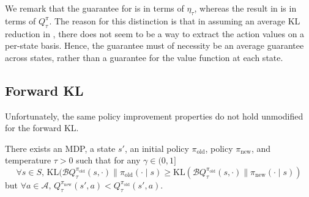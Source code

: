 \documentclass[twoside,11pt]{article}
\newcommand{\actionspace}{\mathcal{A}}
\newcommand{\KL}{\mathrm{KL}}
\newcommand{\boltzmannQ}{\mathcal{B}Q}
\newcommand{\pinew}{{\pi_\mathrm{new}}}
\newcommand{\piold}{{\pi_\mathrm{old}}}
\begin{document}
We remark that the guarantee for  is in terms of $\eta_\tau$, whereas the result in  is in terms of $Q^\pi_\tau$. The reason for this distinction is that in assuming an average KL reduction in , there does not seem to be a way to extract the action values on a per-state basis. Hence, the guarantee must of necessity be an average guarantee across states, rather than a guarantee for the value function at each state. 


\subsection{Forward KL}
Unfortunately, the same policy improvement properties do not hold unmodified for the forward KL. 
\begin{proposition}\label{lem:forward-kl-counterexample}
There exists an MDP, a state $s'$, an initial policy $\piold$, policy $\pinew$, and temperature $\tau > 0$ such that for any $\gamma \in (0, 1]$
\begin{equation*}
    \forall s \in S,\, \KL(\boltzmannQ_\tau^\piold(s, \cdot) \parallel \piold(\cdot \mid s) \geq \KL(\boltzmannQ_\tau^\piold(s, \cdot) \parallel \pinew(\cdot \mid s))
    \end{equation*}
but $\forall a \in \actionspace, \, Q_\tau^\pinew(s', a) < Q_\tau^\piold(s', a)$.
\end{proposition}
\end{document}
